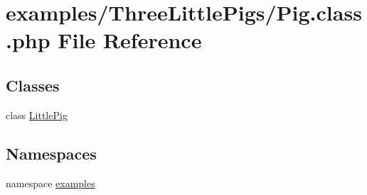 \hypertarget{_pig_8class_8php}{
\section{examples/ThreeLittlePigs/Pig.class.php File Reference}
\label{_pig_8class_8php}
}
\subsection*{Classes}
\begin{CompactItemize}
\item 
class \hyperlink{class_little_pig}{LittlePig}
\end{CompactItemize}
\subsection*{Namespaces}
\begin{CompactItemize}
\item 
namespace \hyperlink{namespaceexamples}{examples}
\end{CompactItemize}
